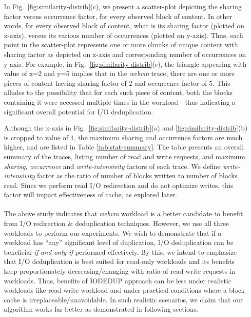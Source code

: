 In Fig.~\ref{fig:similarity-distrib}(c), we present a scatter-plot depicting
the sharing factor versus occurrence factor, for every observed block of content.
In other words, for every observed block of content, 
what is its sharing factor (plotted on x-axis), 
versus its various number of occurrences (plotted on y-axis).
Thus, each point in the scatter-plot represents one or more chunks of unique
content with sharing factor as depicted on x-axis and corresponding
number of occurrences on y-axis. For example, in Fig.~\ref{fig:similarity-distrib}(c),
the triangle appearing with value of x=2 and y=5 implies that in the 
\textit{webvm} trace, there are one or more pieces of content having
sharing factor of 2 and occurrence factor of 5. This alludes to the possibility
that for each such piece of content, both the blocks containing it 
were accessed multiple times in the workload---thus
indicating a significant overall potential for I/O deduplication.

Although the x-axis in
Fig.~\ref{fig:similarity-distrib}(a) and \ref{fig:similarity-distrib}(b)
is cropped to
value of 4, the maximum sharing and occurrence factors
are much higher, and are listed in Table \ref{tab:stat-summary}.
The table presents an overall summary of the traces,
listing number of read and write requests, and
maximum \textit{sharing}, \textit{occurrence} and
\textit{write-intensivity} factors of each trace.
We define \textit{write-intensivity}
factor as the ratio of number of blocks written to number of blocks read. Since
we perform read I/O redirection 
and do not optimize writes, this factor
will impact effectiveness of cache, as explored later.
\\
\\
The above study indicates that \textit{webvm} workload is a better candidate to
benefit from I/O redirection \& deduplication techniques. However,
we use all three workloads
to perform our experiments. We wish to demonstrate that if a workload has
``any'' significant level of duplication, I/O deduplication can be beneficial
\textit{if and only if} performed effectively. By this, we intend to emphasize
that I/O deduplication is best suited for read-only workloads and its benefits 
keep proportionately decreasing/changing with ratio of read-write requests 
in workloads. Thus, benefits of IODEDUP approach can be less under realistic 
workloads like read-write workload and under practical conditions where a 
block cache is irreplaceable/unavoidable. In such realistic scenarios, we 
claim that our algorithm works far better as demonstrated in following sections.

